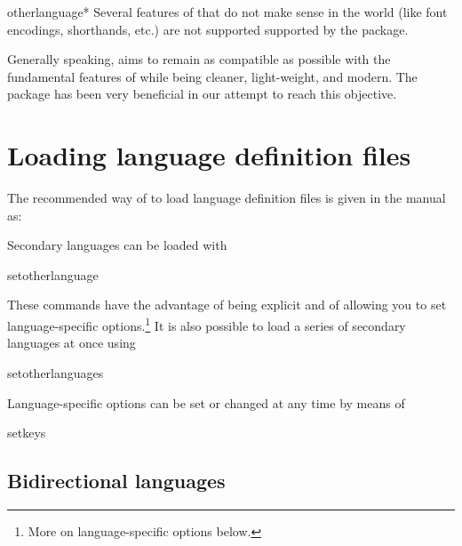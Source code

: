 \begin{docCommandd}{otherlanguage*} { }
 Several features of  that do not make sense in the \XeTeX\/\luatex world (like font
 encodings, shorthands, etc.) are not supported supported by the package.
 
 Generally speaking,  aims to remain as compatible as possible
 with the fundamental features of  while being cleaner, light-weight,
 and modern. The package  has been very beneficial in our attempt to
 reach this objective.


\section{Loading language definition files}

The recommended way of  to load language definition files
is given in the manual as:
 
 
 Secondary languages can be loaded with

\begin{docCmd} {setotherlanguage}{}
\end{docCmd}
 These commands have the advantage of being explicit and of allowing you to set
 language-specific options.\footnote{ %
 More on language-specific options below.}
 It is also possible to load a series of secondary languages at once using

\begin{docCmd}{setotherlanguages} { }
\end{docCmd}

 Language-specific options can be set or changed at any time by means of
\begin{docCmd}{setkeys} { }
\end{docCmd}

\subsection{Bidirectional languages}





\begin{comment}
\begin{Arabic}
ّ هو إذ الغاية؛ شريف الفوائد، جم المذهب، عزيز فنّ التاريخ فنّ أنّ اعلم
والملوك سيرهم، في والأنبياء أخلاقهم، في الأمم من الماضين أحوال على يوقفنا
ّ أحوال في يرومه لمن ذلك في الإقتداء فائدة تتم حتّى وسياستهم؛ دولهم في
والدنيا. الدين
\end{Arabic}
\end{comment}


\end{docCommandd}
